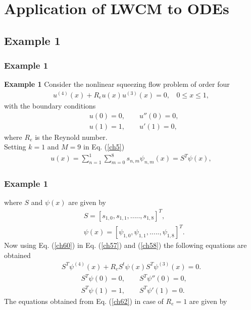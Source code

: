 \documentclass{beamer}
\begin{document}
\section{Application of LWCM to ODEs}
\subsection*{Example 1}
\begin{frame}\frametitle{Example 1}
	\justifying
\textbf{Example 1} Consider the nonlinear squeezing flow problem of order four \cite{Idrees}
\begin{eqnarray}\label{ch57}
u^{(4)}(x)+R_{e}u(x)u^{(3)}(x)=0,~~~~0\leq x \leq 1,
\end{eqnarray}
with the boundary conditions
\begin{eqnarray}\label{ch58}
&u(0)=0,~~~~~~~~~u''(0)=0,\nonumber\\
&u(1)=1,~~~~~~~~~u'(1)=0,
\end{eqnarray}
where $R_{e}$ is the Reynold number.\\
Setting $k=1$ and $M=9$ in Eq. (\ref{ch5})
\begin{eqnarray}\label{ch60}
u(x)=\sum_{n=1}^{1}\sum_{m=0}^{8}s_{n,m}\psi_{n,m}(x)=S^{T}\psi(x),
\end{eqnarray}	
\end{frame}
\begin{frame}\frametitle{Example 1}
\justifying
where $S$ and $\psi(x)$ are given by
\begin{align}
&S=[s_{1,0}, s_{1,1}, .....,s_{1,8}]^{T},\nonumber\\
&\psi(x)=[\psi_{1,0}, \psi_{1,1}, .....,\psi_{1,8}]^{T}.\nonumber
\end{align}
\small
Now using Eq. (\ref{ch60}) in Eq. (\ref{ch57}) and (\ref{ch58}) the following equations are obtained
\begin{eqnarray}\label{ch61}
S^{T}\psi^{(4)}(x)+R_{e}S^{t}\psi(x)S^{T}\psi^{(3)}(x)=0.
\end{eqnarray}
\small
\begin{eqnarray}\label{ch62}
&S^{T}\psi(0)=0,~~~~~~~~~S^{T}\psi''(0)=0,\nonumber\\
&S^{T}\psi(1)=1,~~~~~~~~~S^{T}\psi'(1)=0.
\end{eqnarray}
\small
The equations obtained from Eq. (\ref{ch62}) in case of $R_{e}=1$ are given by
\end{frame}
\end{document}
